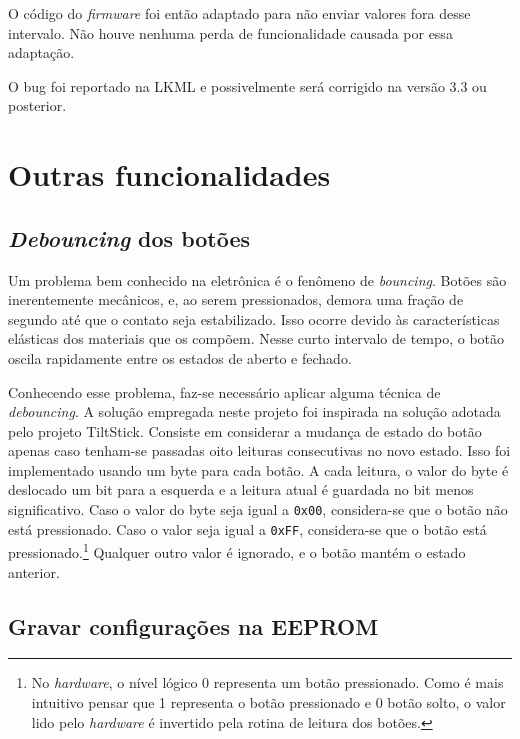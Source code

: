 \documentclass[brazil,pagestart=firstchapter]{abnt}
\begin{document}
O código do \textit{firmware} foi então adaptado para não enviar valores
fora desse intervalo. Não houve nenhuma perda de funcionalidade causada por
essa adaptação.

O bug foi reportado na \ac{LKML} \cite{LKMLhidnullvalues} e possivelmente
será corrigido na versão 3.3 ou posterior. \cite{LKMLhidnullvaluesResposta}


\section{Outras funcionalidades}
\label{sec:outras_funcionalidades}


\subsection{\textit{Debouncing} dos botões}
\label{sub:debouncing}

Um problema bem conhecido na eletrônica é o fenômeno de \textit{bouncing}.
Botões são inerentemente mecânicos, e, ao serem pressionados, demora uma
fração de segundo até que o contato seja estabilizado. Isso ocorre devido às
características elásticas dos materiais que os compõem. Nesse curto
intervalo de tempo, o botão oscila rapidamente entre os estados de aberto e
fechado.

Conhecendo esse problema, faz-se necessário aplicar alguma técnica de
\textit{debouncing}. A solução empregada neste projeto foi inspirada na
solução adotada pelo projeto TiltStick. \cite{TiltStick} Consiste em
considerar a mudança de estado do botão apenas caso tenham-se passadas oito
leituras consecutivas no novo estado. Isso foi implementado usando um byte
para cada botão. A cada leitura, o valor do byte é deslocado um bit para a
esquerda e a leitura atual é guardada no bit menos significativo. Caso o
valor do byte seja igual a \texttt{0x00}, considera-se que o botão não está
pressionado. Caso o valor seja igual a \texttt{0xFF}, considera-se que o
botão está pressionado.\footnote{
	No \textit{hardware}, o nível lógico 0 representa um botão pressionado.
	Como é mais intuitivo pensar que 1 representa o botão pressionado e 0
	botão solto, o valor lido pelo \textit{hardware} é invertido pela rotina
	de leitura dos botões.
} Qualquer outro valor é ignorado, e o botão mantém o estado anterior.


\subsection{Gravar configurações na EEPROM}
\label{sub:eeprom}
\end{document}
